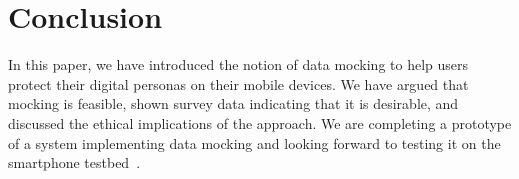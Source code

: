 \section{Conclusion}
\label{sec-conclusion}

In this paper, we have introduced the notion of data mocking to help users
protect their digital personas on their mobile devices. We have argued that
mocking is feasible, shown survey data indicating that it is desirable, and
discussed the ethical implications of the approach. We are completing a
prototype of a system implementing data mocking and looking forward to
testing it on the \PhoneLab{} smartphone testbed~\cite{phonelab-sensemine13}.
